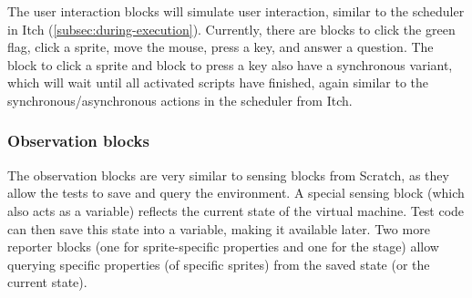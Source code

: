 \documentclass[../main]{subfiles}
\begin{document}
\begin{varwidth}{0.5\linewidth}
    \begin{scratch}[scale=0.6]
    \end{scratch}
\end{varwidth}%
\hspace{1em}%
\begin{varwidth}{0.5\linewidth}
    \begin{scratch}[scale=0.6]
    \end{scratch}
\end{varwidth}%

The user interaction blocks will simulate user interaction, similar to the scheduler in Itch (\cref{subsec:during-execution}).
Currently, there are blocks to click the green flag, click a sprite, move the mouse, press a key, and answer a question.
The block to click a sprite and block to press a key also have a synchronous variant, which will wait until all activated scripts have finished, again similar to the synchronous/asynchronous actions in the scheduler from Itch.

\subsubsection{Observation blocks}

\begin{varwidth}{0.2\linewidth}
\end{varwidth}%
\hspace{1em}%
\begin{varwidth}{0.5\linewidth}
\end{varwidth}%
\hspace{1em}%
\begin{varwidth}{0.3\linewidth}
\end{varwidth}

The observation blocks are very similar to sensing blocks from Scratch, as they allow the tests to save and query the environment.
A special sensing block (which also acts as a variable) reflects the current state of the virtual machine.
Test code can then save this state into a variable, making it available later.
Two more reporter blocks (one for sprite-specific properties and one for the stage) allow querying specific properties (of specific sprites) from the saved state (or the current state).
\end{document}
